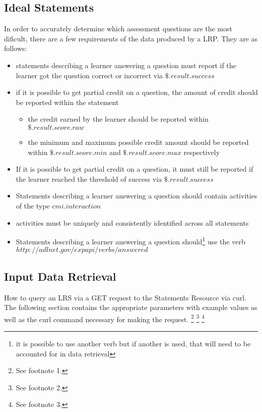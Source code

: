 \documentclass{article}
\begin{document}
\subsection{Ideal Statements}
In order to accurately determine which assessment questions are the
most dificult, there are a few requirements of the data produced by a
LRP. They are as follows:
\begin{itemize}
\item statements describing a learner answering a question must report
  if the learner got the question correct or incorrect via $\$.result.success$
\item if it is possible to get partial credit on a question, the amount
  of credit should be reported within the statement
  \begin{itemize}
  \item the credit earned by the learner should be reported within \\ $\$.result.score.raw$
  \item the minimum and maximum possible credit amount should be
    reported within $\$.result.score.min$ and $\$.result.score.max$
    respectively
  \end{itemize}
\item If it is possible to get partial credit on a question, it must
  still be reported if the learner reached the threshold of success
  via $\$.result.success$
\item Statements describing a learner answering a question should
  contain activities of the type $cmi.interaction$
\item activities must be uniquely and consistently identified across
  all statements
\item Statements describing a learner answering a question
  should\footnote{\label{verbIRI} it is possible to use another verb but if another is
    used, that will need to be accounted for in data retrieval} use
  the verb $http://adlnet.gov/expapi/verbs/answered$
\end{itemize}

\subsection{Input Data Retrieval}
How to query an LRS via a GET request to the Statements Resource via
curl. The following section contains the appropriate parameters with
example values as well as the curl command necessary for making the request.
\footnote{\label{refMoreLink} See footnote 1.}
\footnote{\label{refnoZ} See footnote 2.}
\footnote{\label{refallTime} See footnote 3.}
\end{document}
